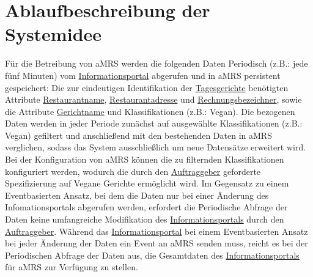 \section{Ablaufbeschreibung der Systemidee}\label{cha:AblaufbeschreibungderSystemidee}
Für die Betreibung von \ac{aMRS} werden die folgenden Daten Periodisch (z.B.: jede fünf Minuten) vom \hyperref[gls:informationsportal]{Informationsportal} abgerufen und in \ac{aMRS} persistent gespeichert:
Die zur eindeutigen Identifikation der \hyperref[gls:tagesgericht]{Tagesgerichte} benötigten Attribute \hyperref[gls:restaurantname]{Restaurantname}, \hyperref[gls:restaurantadresse]{Restaurantadresse} und \hyperref[gls:Rechnungsbezeichner]{Rechnungsbezeichner}, sowie die Attribute \hyperref[gls:gerichtname]{Gerichtname} und Klassifikationen (z.B.: Vegan).
Die bezogenen Daten werden in jeder Periode zunächst auf ausgewählte Klassifikationen (z.B.: Vegan) gefiltert und anschließend mit den bestehenden Daten in \ac{aMRS} verglichen, sodass das System ausschließlich um neue Datensätze erweitert wird.
Bei der Konfiguration von \ac{aMRS} können die zu filternden Klassifikationen konfiguriert werden, wodurch die durch den \hyperref[gls:auftraggeber]{Auftraggeber} geforderte Spezifizierung auf Vegane Gerichte ermöglicht wird.
\newparagraph
Im Gegensatz zu einem Eventbasierten Ansatz, bei dem die Daten nur bei einer Änderung des Infomationsportals abgerufen werden, erfordert die Periodische Abfrage der Daten keine umfangreiche Modifikation des \hyperref[gls:informationsportal]{Informationsportals} durch den \hyperref[gls:auftraggeber]{Auftraggeber}.
Während das \hyperref[gls:informationsportal]{Informationsportal} bei einem Eventbasierten Ansatz bei jeder Änderung der Daten ein Event an \ac{aMRS} senden muss, reicht es bei der Periodischen Abfrage der Daten aus, die Gesamtdaten des \hyperref[gls:informationsportal]{Informationsportals} für \ac{aMRS} zur Verfügung zu stellen.
\newparagraph
